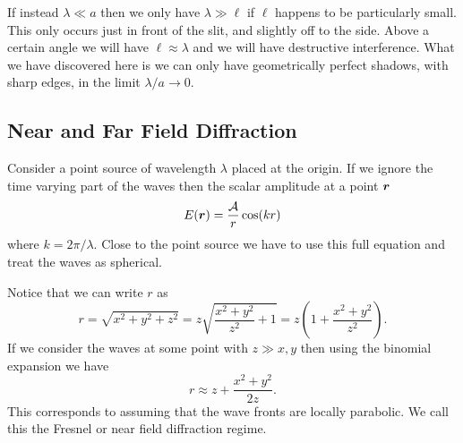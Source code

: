 \documentclass[a4paper]{article}
\begin{document}
    If instead \(\lambda \ll a\) then we only have \(\lambda \gg \ell\) if \(\ell\) happens to be particularly small.
    This only occurs just in front of the slit, and slightly off to the side.
    Above a certain angle we will have \(\ell \approx \lambda\) and we will have destructive interference.
    What we have discovered here is we can only have geometrically perfect shadows, with sharp edges, in the limit \(\lambda/a\to 0\).
    
    \subsection{Near and Far Field Diffraction}
    Consider a point source of wavelength \(\lambda\) placed at the origin.
    If we ignore the time varying part of the waves then the scalar amplitude at a point \(\bm{r}\) 
    \[E(\bm{r}) = \frac{\mathcal{A}}{r}\cos(kr)\]
    where \(k = 2\pi/\lambda\).
    Close to the point source we have to use this full equation and treat the waves as spherical.
    
    Notice that we can write \(r\) as
    \[r = \sqrt{x^2 + y^2 + z^2} = z\sqrt{\frac{x^2 + y^2}{z^2} + 1} = z\left( 1 + \frac{x^2 + y^2}{z^2} \right).\]
    If we consider the waves at some point with \(z \gg x, y\) then using the binomial expansion we have
    \[r \approx z + \frac{x^2 + y^2}{2z}.\]
    This corresponds to assuming that the wave fronts are locally parabolic.
    We call this the Fresnel or near field diffraction regime.
    
\end{document}
